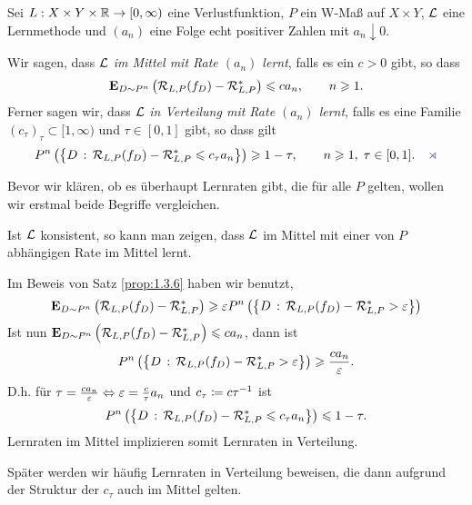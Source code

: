 \begin{defn}
\label{defn:1.4.1}
Sei $L:X\times Y\times \mathbb{R}\to[0,\infty)$ eine Verlustfunktion, $P$ ein W-Maß auf
$X\times Y$, $\mathcal{L}$ eine Lernmethode und $(a_n)$ eine Folge echt positiver
Zahlen mit $a_n\downarrow 0$.

Wir sagen, dass $\mathcal{L}$ \emph{im Mittel mit Rate $(a_n)$ lernt},
falls es ein $c>0$ gibt, so dass
\begin{align*}
\textbf{E}_{D\sim P^n} \left(\mathcal{R}_{L,P}(f_D)-\mathcal{R}_{L,P}^*\right)
\leqslant ca_n,\qquad n\geqslant 1.
\end{align*}
Ferner sagen wir, dass $\mathcal{L}$ \emph{in Verteilung mit Rate $(a_n)$ lernt},
falls es eine Familie $(c_\tau)_\tau\subset [1,\infty)$ und $\tau\in [0,1]$
gibt, so dass gilt
\begin{align*}
P^n\left(\setdef{D}{\RR_{L,P}(f_D) - \RR_{L,P}^* \le c_\tau a_n} \right) \ge
1-\tau,\qquad n\ge 1,\; \tau\in[0,1].\fishhere
\end{align*}
\end{defn}

Bevor wir klären, ob es überhaupt Lernraten gibt, die für alle $P$ gelten,
wollen wir erstmal beide Begriffe vergleichen.

\begin{bem*}[Bemerkungen.]
\begin{bemenum}
\item Ist $\mathcal{L}$ konsistent, so kann man zeigen, dass $\mathcal{L}$ im Mittel mit einer
von $P$ abhängigen Rate im Mittel lernt.
\item Im Beweis von Satz \ref{prop:1.3.6} haben wir benutzt,
\begin{align*}
\textbf{E}_{D\sim P^n}\left(\mathcal{R}_{L,P}(f_D) - \mathcal{R}_{L,P}^* \right)
\geqslant \varepsilon P^n\left(\left\{ D\,:\,\mathcal{R}_{L,P}(f_D)- \mathcal{R}_{L,P}^* > \varepsilon\right\}\right)
\end{align*}
Ist nun $\textbf{E}_{D\sim P^n}\left(\mathcal{R}_{L,P}(f_D) - \mathcal{R}_{L,P}^*\right) \leqslant c a_n$,
dann ist
\begin{align*}
P^n\left(\left\{ D\,:\,\mathcal{R}_{L,P}(f_D)- \mathcal{R}_{L,P}^* > \varepsilon\right\}\right)
\geqslant \frac{c a_n}{\varepsilon}.
\end{align*}
D.h. für $\tau=\frac{c a_n}{\varepsilon} \Leftrightarrow \varepsilon = \frac{c}{\tau}a_n$ und
$c_\tau \coloneq c\tau^{-1}$ ist
\begin{align*}
P^n\left(\left\{ D\,:\,\mathcal{R}_{L,P}(f_D)- \mathcal{R}_{L,P}^* \leqslant c_\tau a_n\right\}\right)
\leqslant 1-\tau.
\end{align*}
Lernraten im Mittel implizieren somit Lernraten in Verteilung.
\item Später werden wir häufig Lernraten in Verteilung beweisen, die
dann aufgrund der Struktur der $c_\tau$ auch im Mittel gelten.\maphere
\end{bemenum}
\end{bem*}

